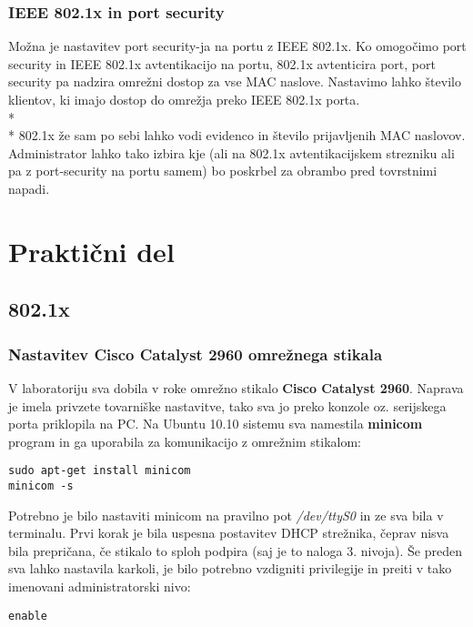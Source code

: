 \documentclass[12pt]{article}
\let\stdsection\section
\renewcommand\section{\newpage\stdsection}
\begin{document}
\subsubsection{IEEE 802.1x in port security}

Možna je nastavitev port security-ja na portu z IEEE 802.1x. Ko omogočimo port security in IEEE 802.1x avtentikacijo na portu, 802.1x avtenticira port, port security pa nadzira omrežni dostop za vse MAC naslove. Nastavimo lahko število klientov, ki imajo dostop do omrežja preko IEEE 802.1x porta.
\\*
\\* \indent
802.1x že sam po sebi lahko vodi evidenco in število prijavljenih MAC naslovov. Administrator lahko tako izbira kje (ali na 802.1x avtentikacijskem strezniku ali pa z port-security na portu samem) bo poskrbel za obrambo pred tovrstnimi napadi.


\section{Praktični del}

\subsection{802.1x}

\subsubsection{Nastavitev Cisco Catalyst 2960 omrežnega stikala}

V laboratoriju sva dobila v roke omrežno stikalo \textbf{Cisco Catalyst 2960}. Naprava je imela privzete tovarniške nastavitve, tako sva jo preko konzole oz. serijskega porta priklopila na PC. Na Ubuntu 10.10 sistemu sva namestila \textbf{minicom} program in ga uporabila za komunikacijo z omrežnim stikalom:

\begin{verbatim}
sudo apt-get install minicom
minicom -s
\end{verbatim}

Potrebno je bilo nastaviti minicom na pravilno pot \emph{/dev/ttyS0} in ze sva bila v terminalu. Prvi korak je bila uspesna postavitev DHCP strežnika, čeprav nisva bila prepričana, če stikalo to sploh podpira (saj je to naloga 3. nivoja). Še preden sva lahko nastavila karkoli, je bilo potrebno vzdigniti privilegije in preiti v tako imenovani administratorski nivo:

\begin{verbatim}
enable
\end{verbatim}
\end{document}
